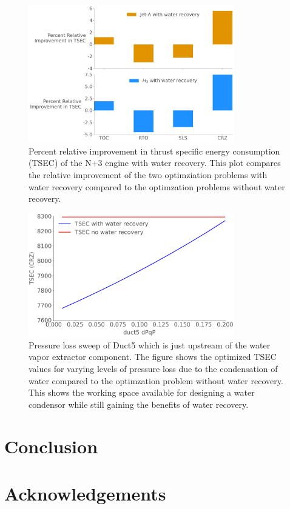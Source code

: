 \documentclass[conf]{new-aiaa}
\begin{document}
\begin{figure}[hbt!]
    \centering
    \includegraphics[width=0.8\textwidth]{JetA-H2_TSEC_diff.pdf}
    \caption{Percent relative improvement in thrust specific energy consumption (TSEC) of the N+3 engine with water recovery.
        This plot compares the relative improvement of the two optimziation problems with water recovery compared to the optimzation problems without water recovery.}
    \label{fig:barchart}
\end{figure}


\begin{figure}[hbt!]
    \centering
    \includegraphics[width=0.8\textwidth]{N3_dpqp.pdf}
    \caption{Pressure loss sweep of Duct5 which is just upstream of the water vapor extractor component.
        The figure shows the optimized TSEC values for varying levels of pressure loss due to the condensation of water compared to the optimzation problem without water recovery.
        This shows the working space available for designing a water condensor while still gaining the benefits of water recovery.}
    \label{fig:dpqp_sweep}
\end{figure}


\section{Conclusion}
\label{sec:conc}

\section{Acknowledgements}


\end{document}
